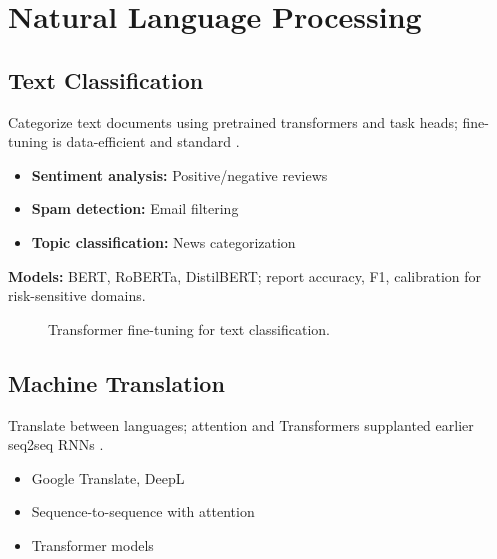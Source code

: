 
\section{Natural Language Processing }
\label{sec:nlp-applications}

\subsection{Text Classification}

Categorize text documents using pretrained transformers and task heads; fine-tuning is data-efficient and standard \textcite{Devlin2018,Prince2023,D2LChapterAttention}.
\begin{itemize}
    \item \textbf{Sentiment analysis:} Positive/negative reviews
    \item \textbf{Spam detection:} Email filtering
    \item \textbf{Topic classification:} News categorization
\end{itemize}

\textbf{Models:} BERT, RoBERTa, DistilBERT; report accuracy, F1, calibration for risk-sensitive domains.

\begin{figure}[h]
  \centering
  \caption{Transformer fine-tuning for text classification.}
  \label{fig:nlp-class}
\end{figure}

\subsection{Machine Translation}

Translate between languages; attention and Transformers supplanted earlier seq2seq RNNs \textcite{Bahdanau2014,Vaswani2017,GoodfellowEtAl2016,D2LChapterAttention}.
\begin{itemize}
    \item Google Translate, DeepL
    \item Sequence-to-sequence with attention
    \item Transformer models
\end{itemize}

